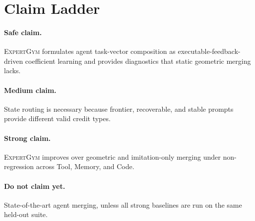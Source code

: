 \documentclass[11pt]{article}
\newcommand{\method}{\textsc{ExpertGym}\xspace}
\begin{document}
\section{Claim Ladder}

\paragraph{Safe claim.}  \method formulates agent task-vector composition as executable-feedback-driven coefficient learning and provides diagnostics that static geometric merging lacks.

\paragraph{Medium claim.}  State routing is necessary because frontier, recoverable, and stable prompts provide different valid credit types.

\paragraph{Strong claim.}  \method improves over geometric and imitation-only merging under non-regression across Tool, Memory, and Code.

\paragraph{Do not claim yet.}  State-of-the-art agent merging, unless all strong baselines are run on the same held-out suite.
\end{document}

